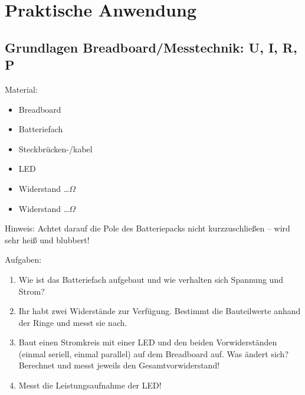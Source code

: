 \clearpage

\section*{Praktische Anwendung}


\subsection*{Grundlagen Breadboard/Messtechnik: U, I, R, P}

Material:

\begin{itemize}
    \item Breadboard
    \item Batteriefach
    \item Steckbrücken-/kabel
    \item LED
    \item Widerstand \dots $\Omega$
    \item Widerstand \dots $\Omega$
\end{itemize}

Hinweis: Achtet darauf die Pole des Batteriepacks nicht kurzzuschließen -- wird
sehr heiß und blubbert!

Aufgaben:


\begin{enumerate}
    \item Wie ist das Batteriefach aufgebaut und wie verhalten sich Spannung und Strom?
    \item Ihr habt zwei Widerstände zur Verfügung. Bestimmt die Bauteilwerte
          anhand der Ringe und messt sie nach.
    \item Baut einen Stromkreis mit einer LED und den beiden Vorwiderständen
          (einmal seriell, einmal parallel) auf dem Breadboard auf. Was ändert
          sich? Berechnet und messt jeweils den Gesamtvorwiderstand!
    \item Messt die Leistungsaufnahme der LED!
\end{enumerate}

